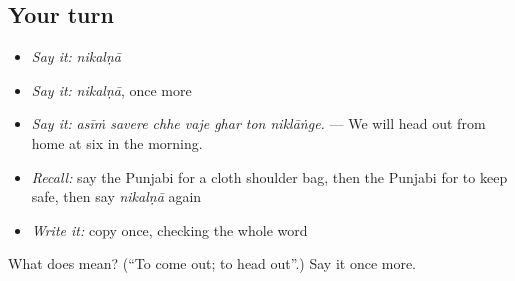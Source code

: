 \subsection*{Your turn}
\begin{itemize}
\raggedright
  \item \emph{Say it:} \emph{nikalṇā}
  \item \emph{Say it:} \emph{nikalṇā}, once more
  \item \emph{Say it:} \emph{asīṁ savere chhe vaje ghar ton niklāṅge.} — We will head out from home at six in the morning.
  \item \emph{Recall:} say the Punjabi for a cloth shoulder bag, then the Punjabi for to keep safe, then say \emph{nikalṇā} again
  \item \emph{Write it:} copy \textbf{} once, checking the whole word
\end{itemize}

\begin{tcolorbox}[breakable,colback=teal!4,colframe=teal!35!black,title={Before you move on}]
What does  mean? (\textquotedblleft{}To come out; to head out\textquotedblright{}.) Say it once more.
\end{tcolorbox}
